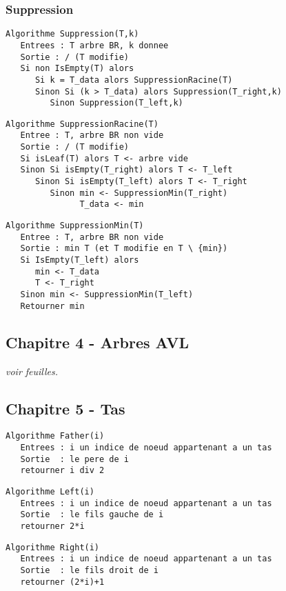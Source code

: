 \documentclass{article}
\begin{document}
\subsubsection{Suppression}

\begin{lstlisting}
Algorithme Suppression(T,k)
   Entrees : T arbre BR, k donnee
   Sortie : / (T modifie)
   Si non IsEmpty(T) alors
      Si k = T_data alors SuppressionRacine(T)
      Sinon Si (k > T_data) alors Suppression(T_right,k)
         Sinon Suppression(T_left,k)
\end{lstlisting}

\begin{lstlisting}
Algorithme SuppressionRacine(T)
   Entree : T, arbre BR non vide
   Sortie : / (T modifie)
   Si isLeaf(T) alors T <- arbre vide
   Sinon Si isEmpty(T_right) alors T <- T_left
      Sinon Si isEmpty(T_left) alors T <- T_right
         Sinon min <- SuppressionMin(T_right)
               T_data <- min
\end{lstlisting}

\begin{lstlisting}
Algorithme SuppressionMin(T)
   Entree : T, arbre BR non vide
   Sortie : min T (et T modifie en T \ {min})
   Si IsEmpty(T_left) alors
      min <- T_data
      T <- T_right
   Sinon min <- SuppressionMin(T_left)
   Retourner min
\end{lstlisting}

\subsection{Chapitre 4 - Arbres AVL}

\textit{voir feuilles.}

\subsection{Chapitre 5 - Tas}

\begin{lstlisting}
Algorithme Father(i)
   Entrees : i un indice de noeud appartenant a un tas
   Sortie  : le pere de i
   retourner i div 2
\end{lstlisting}

\begin{lstlisting}
Algorithme Left(i)
   Entrees : i un indice de noeud appartenant a un tas
   Sortie  : le fils gauche de i
   retourner 2*i
\end{lstlisting}

\begin{lstlisting}
Algorithme Right(i)
   Entrees : i un indice de noeud appartenant a un tas
   Sortie  : le fils droit de i
   retourner (2*i)+1
\end{lstlisting}
\end{document}
